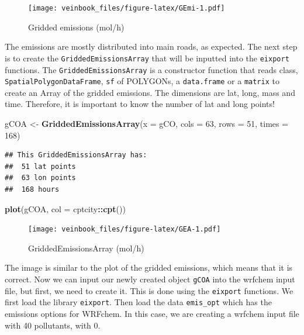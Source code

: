 \documentclass[12pt,graybox,envcountchap,sectrefs]{krantz}
\makeatletter
\newenvironment{Shaded}{\begin{snugshade}}{\end{snugshade}}
\newcommand{\KeywordTok}[1]{\textcolor[rgb]{0.13,0.29,0.53}{\textbf{#1}}}
\newcommand{\DataTypeTok}[1]{\textcolor[rgb]{0.13,0.29,0.53}{#1}}
\newcommand{\DecValTok}[1]{\textcolor[rgb]{0.00,0.00,0.81}{#1}}
\newcommand{\StringTok}[1]{\textcolor[rgb]{0.31,0.60,0.02}{#1}}
\newcommand{\OperatorTok}[1]{\textcolor[rgb]{0.81,0.36,0.00}{\textbf{#1}}}
\newcommand{\NormalTok}[1]{#1}
\newenvironment{kframe}{%
\medskip{}
\setlength{\fboxsep}{.8em}
 \def\at@end@of@kframe{}%
 \ifinner\ifhmode%
  \def\at@end@of@kframe{\end{minipage}}%
  \begin{minipage}{\columnwidth}%
 \fi\fi%
 \def\FrameCommand##1{\hskip\@totalleftmargin \hskip-\fboxsep
 \colorbox{shadecolor}{##1}\hskip-\fboxsep
     \hskip-\linewidth \hskip-\@totalleftmargin \hskip\columnwidth}%
 \MakeFramed {\advance\hsize-\width
   \@totalleftmargin\z@ \linewidth\hsize
   \@setminipage}}%
 {\par\unskip\endMakeFramed%
 \at@end@of@kframe}
\renewenvironment{Shaded}{\begin{kframe}}{\end{kframe}}
\theoremstyle{definition}
\theoremstyle{definition}
\theoremstyle{definition}
\theoremstyle{remark}
\makeatother
\begin{document}
\begin{figure}
\centering
\texttt{[image: veinbook\_files/figure-latex/GEmi-1.pdf]}
\caption{\label{fig:GEmi}Gridded emissions (mol/h)}
\end{figure}

The emissions are mostly distributed into main roads, as expected. The
next step is to create the \texttt{GriddedEmissionsArray} that will be
inputted into the \texttt{eixport} functions. The
\texttt{GriddedEmissionsArray} is a constructor function that reads
class, \texttt{SpatialPolygonDataFrame}, \texttt{sf} of POLYGONs, a
\texttt{data.frame} or a \texttt{matrix} to create an Array of the
gridded emissions. The dimensions are lat, long, mass and time.
Therefore, it is important to know the number of lat and long points!

\begin{Shaded}
\begin{Highlighting}[]
\NormalTok{gCOA <-}\StringTok{ }\KeywordTok{GriddedEmissionsArray}\NormalTok{(}\DataTypeTok{x =}\NormalTok{ gCO, }\DataTypeTok{cols =} \DecValTok{63}\NormalTok{, }\DataTypeTok{rows =} \DecValTok{51}\NormalTok{, }\DataTypeTok{times =} \DecValTok{168}\NormalTok{)}
\end{Highlighting}
\end{Shaded}

\begin{verbatim}
## This GriddedEmissionsArray has:
##  51 lat points
##  63 lon points
##  168 hours
\end{verbatim}

\begin{Shaded}
\begin{Highlighting}[]
\KeywordTok{plot}\NormalTok{(gCOA, }\DataTypeTok{col =}\NormalTok{ cptcity}\OperatorTok{::}\KeywordTok{cpt}\NormalTok{())}
\end{Highlighting}
\end{Shaded}

\begin{figure}
\centering
\texttt{[image: veinbook\_files/figure-latex/GEA-1.pdf]}
\caption{\label{fig:GEA}GriddedEmissionsArray (mol/h)}
\end{figure}

The image is similar to the plot of the gridded emissions, which means
that it is correct. Now we can input our newly created object
\texttt{gCOA} into the wrfchem input file, but first, we need to create
it. This is done using the \texttt{eixport} functions. We first load the
library \texttt{eixport}. Then load the data \texttt{emis\_opt} which
has the emissions options for WRFchem. In this case, we are creating a
wrfchem input file with 40 pollutants, with 0.
\end{document}

